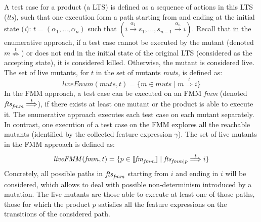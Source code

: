 A test case for a product (\ie a LTS) is defined as a sequence of actions in this LTS (\textit{lts}), such that one execution form a path starting from and ending at the initial state (\textit{i}): $t=(\alpha_1, ..., \alpha_n) $ such that $ (i \overset{\alpha_1}{\longrightarrow} s_1, ..., s_{n-1} \overset{\alpha_n}{\longrightarrow} i)$.
Recall that in the enumerative approach, if a test case cannot be executed by the mutant (denoted $m \overset{t}{\nRightarrow}$) or does not end in the initial state of the original LTS (considered as the accepting state), it is considered  killed. Otherwise, the mutant is considered live. The set of live mutants, for $t$ in the set of mutants \textit{muts}, is defined as:
%
$$\mathit{liveEnum}(\mathit{muts}, t) = \{ m \in \mathit{muts} \mid m \overset{t}{\Longrightarrow} i  \} $$
%
In the FMM approach, a test case can be executed on an FMM \textit{fmm} (denoted $\mathit{fts}_\mathit{{fmm}} \overset{t}{\Longrightarrow}$), if there exists at least one mutant or the product is able to execute it. 
The enumerative approach executes each test case on each mutant separately. In contrast, one execution of a test case on the FMM explores all the reachable mutants (identified by the collected feature expression $\gamma$).
The set of live mutants in the FMM approach is defined as:
%
$$\mathit{liveFMM}(\mathit{fmm}, t) = \{ p \in [\![\mathit{fm}_\mathit{{fmm}}]\!] \mid \mathit{fts}_{\mathit{fmm} \mid p} \overset{t}{\Longrightarrow} i \}$$
%
Concretely, all possible paths in $\mathit{fts}_\mathit{{fmm}}$ starting from $i$ and ending in $i$ will be considered, which allows to deal with possible non-determinism introduced by a mutation. The live mutants are those able to execute at least one of those paths, \ie those for which the product $p$ satisfies all the feature expressions on the transitions of the considered path.

